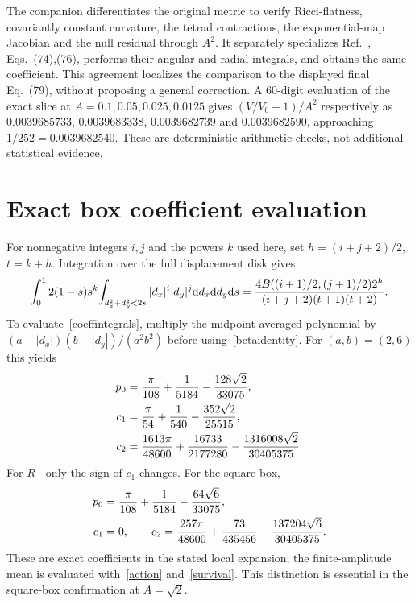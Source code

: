 \documentclass[11pt,a4paper]{article}
\newcommand{\dd}{\mathrm d}
\begin{document}
The companion  differentiates the original
metric to verify Ricci-flatness, covariantly constant curvature, the tetrad
contractions, the exponential-map Jacobian and the null residual through
$A^2$. It separately specializes Ref.~\cite{wang}, Eqs.~(74),(76), performs
their angular and radial integrals, and obtains the same coefficient. This
agreement localizes the comparison to the displayed final Eq.~(79), without
proposing a general correction. A 60-digit evaluation of the exact slice at
$A=0.1,0.05,0.025,0.0125$ gives $(V/V_0-1)/A^2$ respectively as
$0.0039685733$, $0.0039683338$, $0.0039682739$ and $0.0039682590$,
approaching $1/252=0.0039682540$.
These are deterministic arithmetic checks, not additional statistical evidence.

\section{Exact box coefficient evaluation}\label{exact}
For nonnegative integers $i,j$ and the powers $k$ used here, set
$h=(i+j+2)/2$, $t=k+h$. Integration over the full displacement disk gives
\begin{equation}
 \int_0^1 2(1-s)s^k\!\int_{d_x^2+d_y^2<2s}|d_x|^i|d_y|^j\dd d_x\dd d_y\dd s
 ={4B((i+1)/2,(j+1)/2)2^h\over(i+j+2)(t+1)(t+2)}. \label{betaidentity}
\end{equation}
To evaluate~\eqref{coeffintegrals}, multiply the midpoint-averaged polynomial
by $(a-|d_x|)(b-|d_y|)/(a^2b^2)$ before using~\eqref{betaidentity}.
For $(a,b)=(2,6)$ this yields
\begin{align}
 p_0&={\pi\over108}+{1\over5184}-{128\sqrt2\over33075},\nonumber\\
 c_1&={\pi\over54}+{1\over540}-{352\sqrt2\over25515},\nonumber\\
 c_2&={1613\pi\over48600}+{16733\over2177280}
       -{1316008\sqrt2\over30405375}.
\end{align}
For $R_-$ only the sign of $c_1$ changes. For the square box,
\begin{align}
 p_0&={\pi\over108}+{1\over5184}-{64\sqrt6\over33075},\nonumber\\
 c_1&=0,\qquad
 c_2={257\pi\over48600}+{73\over435456}-{137204\sqrt6\over30405375}.
\end{align}
These are exact coefficients in the stated local expansion; the finite-amplitude
mean is evaluated with~\eqref{action} and~\eqref{survival}. This distinction is
essential in the square-box confirmation at $A=\sqrt2$.
\end{document}
